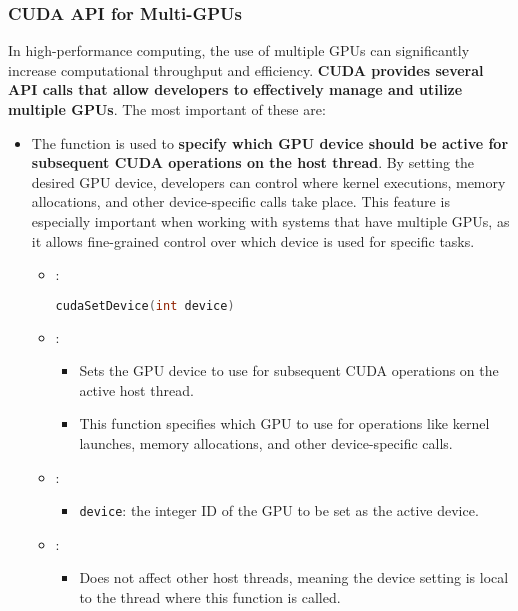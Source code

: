 \subsubsection{CUDA API for Multi-GPUs}

In high-performance computing, the use of multiple GPUs can significantly increase computational throughput and efficiency. \textbf{CUDA provides several API calls that allow developers to effectively manage and utilize multiple GPUs}. The most important of these are:
\begin{itemize}\label{code: cudaSetDevice}
    \item The  function is used to \textbf{specify which GPU device should be active for subsequent CUDA operations on the host thread}. By setting the desired GPU device, developers can control where kernel executions, memory allocations, and other device-specific calls take place. This feature is especially important when working with systems that have multiple GPUs, as it allows fine-grained control over which device is used for specific tasks.
    \begin{itemize}
        \item {}:
        \begin{lstlisting}[language=C++]
cudaSetDevice(int device)\end{lstlisting}
        \item {}:
        \begin{itemize}
            \item Sets the GPU device to use for subsequent CUDA operations on the active host thread.
            \item This function specifies which GPU to use for operations like kernel launches, memory allocations, and other device-specific calls.
        \end{itemize}
        \item {}:
        \begin{itemize}
            \item \texttt{device}: the integer ID of the GPU to be set as the active device.
        \end{itemize}
        \item {}:
        \begin{itemize}
            \item Does not affect other host threads, meaning the device setting is local to the thread where this function is called.

\end{itemize}
\end{itemize}
\end{itemize}
